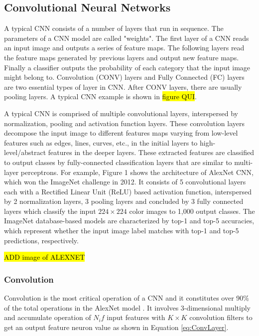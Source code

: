 \documentclass[11pt]{article}
\begin{document}
\subsection{Convolutional Neural Networks}
\label{sec:Background-CNN}

A typical CNN consists of a number of layers that run in sequence. The parameters of a CNN model are called "weights". The first layer of a CNN reads an input image and outputs a series of feature maps. The following layers read the feature maps generated by previous layers and output new feature maps. Finally a classifier outputs the probability of each category that the input image might belong to. Convolution (CONV) layers and Fully Connected (FC) layers are two essential types of layer in CNN. After CONV layers, there are usually pooling layers. A typical CNN example is shown in \hl{figure QUI}.

A typical CNN is comprised of multiple convolutional layers, interspersed by normalization, pooling and activation function layers. These convolution layers decompose the input image to different features maps varying from low-level features such as edges, lines, curves, etc., in the initial layers to high-level/abstract features in the deeper layers. These extracted features are classified to output classes by fully-connected classification layers that are similar to multi-layer perceptrons. For example, Figure 1 shows the architecture of AlexNet CNN\cite{AlexNet}, which won the ImageNet challenge in 2012. It consists of 5 convolutional layers each with a Rectified Linear Unit (ReLU)
based activation function, interspersed by 2 normalization layers, 3 pooling layers and concluded by 3 fully connected layers which classify the input $224\times 224$ color images to 1,000 output classes. The ImageNet database-based models are characterized by top-1 and top-5 accuracies, which represent whether the input image label matches with top-1 and top-5 predictions, respectively.

\hl{ADD image of ALEXNET}

\subsubsection{Convolution}
\label{sec:Background-CNN-Conv}

Convolution is the most critical operation of a CNN and it constitutes over 90\% of the total operations in the AlexNet model \cite{AlexNetAgain}. It involves 3-dimensional multiply and accumulate operation of $N_if$ input features with $K\times K$ convolution filters to get an output feature neuron value as shown in Equation \ref{eq:ConvLayer}.
\end{document}

